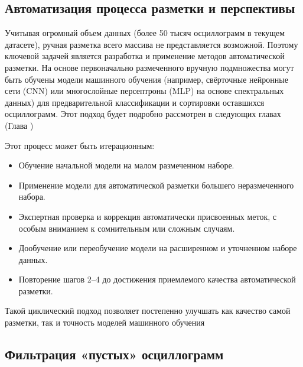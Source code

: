 \subsection{Автоматизация процесса разметки и перспективы}\label{sec:ch3_annotation_automation}

Учитывая огромный объем данных (более 50 тысяч осциллограмм в текущем датасете), ручная разметка всего массива не представляется возможной. Поэтому ключевой задачей является разработка и применение методов автоматической разметки. На основе первоначально размеченного вручную подмножества могут быть обучены модели машинного обучения (например, свёрточные нейронные сети (CNN) или многослойные персептроны (MLP) на основе спектральных данных) для предварительной классификации и сортировки оставшихся осциллограмм. Этот подход будет подробно рассмотрен в следующих главах (Глава ) 

Этот процесс может быть итерационным:

\begin{itemize}
  \item Обучение начальной модели на малом размеченном наборе.
  \item Применение модели для автоматической разметки большего неразмеченного набора.
  \item Экспертная проверка и коррекция автоматически присвоенных меток, с особым вниманием к сомнительным или сложным случаям.
  \item Дообучение или переобучение модели на расширенном и уточненном наборе данных.
  \item Повторение шагов 2--4 до достижения приемлемого качества автоматической разметки.
\end{itemize}

Такой циклический подход позволяет постепенно улучшать как качество самой разметки, так и точность моделей машинного обучения

\subsection{Фильтрация «пустых» осциллограмм}\label{sec:ch3_empty_oscillograms_filter}


